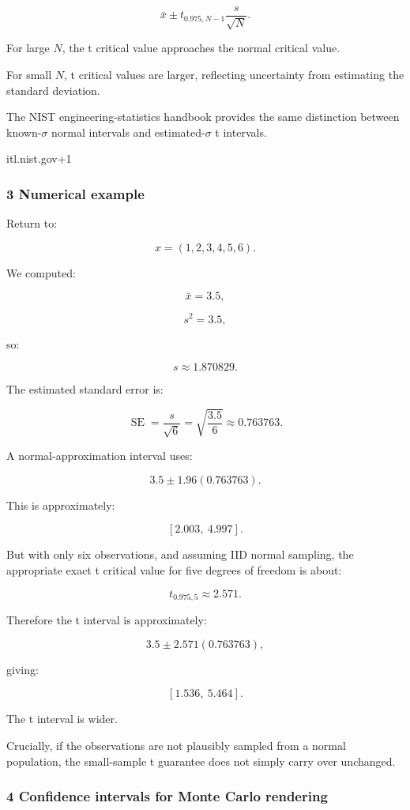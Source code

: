 \[
 \boxed{ \bar x \pm t_{0.975,N-1}\frac{s}{\sqrt N} }.
\]

For large \(N\), the t critical value approaches the normal critical value.

For small \(N\), t critical values are larger, reflecting uncertainty from estimating the standard deviation.

The NIST engineering-statistics handbook provides the same distinction between known-\(\sigma\) normal intervals and estimated-\(\sigma\) t intervals.

itl.nist.gov+1

\subsubsection{3 Numerical example}\label{02-foundations-ii-ch030-numerical-example}

Return to:

\[
 x=(1,2,3,4,5,6).
\]

We computed:

\[
 \bar x=3.5,
\]

\[
 s^2=3.5,
\]

so:

\[
 s\approx1.870829.
\]

The estimated standard error is:

\[
 \operatorname{SE}= \frac{s}{\sqrt6} = \sqrt{\frac{3.5}{6}} \approx0.763763.
\]

A normal-approximation interval uses:

\[
 3.5\pm1.96(0.763763).
\]

This is approximately:

\[
 \boxed{[2.003,\ 4.997]}.
\]

But with only six observations, and assuming IID normal sampling, the appropriate exact t critical value for five degrees of freedom is about:

\[
 t_{0.975,5}\approx2.571.
\]

Therefore the t interval is approximately:

\[
 3.5\pm2.571(0.763763),
\]

giving:

\[
 \boxed{[1.536,\ 5.464]}.
\]

The t interval is wider.

Crucially, if the observations are not plausibly sampled from a normal population, the small-sample t guarantee does not simply carry over unchanged.

\subsubsection{4 Confidence intervals for Monte Carlo rendering}\label{02-foundations-ii-ch030-confidence-intervals-for-monte-carlo-rendering}

